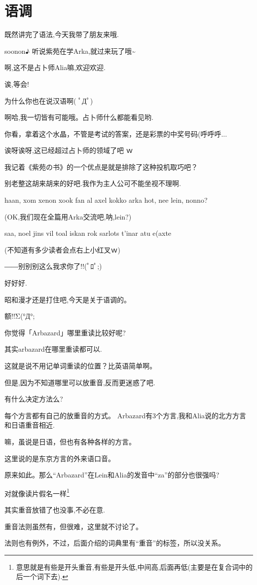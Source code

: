 \chapter[语调]{语调}
既然讲完了语法,今天我带了朋友来哦.

soonon♪
听说紫苑在学Arka,就过来玩了哦\~{}


啊,这不是占卜师Alia嘛,欢迎欢迎.

诶,等会!

为什么你也在说汉语啊( ﾟДﾟ)


啊哈,我一切皆有可能哦。占卜师什么都能看见哟.

你看，拿着这个水晶，不管是考试的答案，还是彩票的中奖号码(呼呼呼...


诶呀诶呀,这已经超过占卜师的领域了吧 ｗ

我记着《紫苑の书》的一个优点是就是排除了这种投机取巧吧？

别老整这胡来胡来的好吧.我作为主人公可不能坐视不理啊.


haan, xom xenon xook fan al axel kokko arka hot, nee lein, nonno?

(OK,我们现在全篇用Arka交流吧,呐,lein?)

saa, noel jins vil toal iskan rok sarlots t'inar atu e(axte

(不知道有多少读者会点右上小红叉ｗ)


――别别别这么我求你了!!(ﾟﾛﾟ;)



好好好.

昭和漫才还是打住吧,今天是关于语调的。


额!!Σ(°Д°;


你觉得「Arbazard」哪里重读比较好呢?

其实arbazard在哪里重读都可以.


这就是说不用记单词重读的位置？比英语简单啊。

但是,因为不知道哪里可以放重音,反而更迷惑了吧.

有什么决定方法么?


每个方言都有自己的放重音的方式。
Arbazard有3个方言,我和Alia说的北方方言和日语重音相近.


嘛，虽说是日语，但也有各种各样的方言。

这里说的是东京方言的外来语口音。


原来如此。那么“Arbazard”在Lein和Alia的发音中“za”的部分也很强吗?


对就像读片假名一样\footnote{意思就是有些是开头重音,有些是开头低,中间高,后面再低(主要是在复合词中的后一个词下去).}

其实重音放错了也没事,不必在意.


重音法则虽然有，但很难，这里就不讨论了。

法则也有例外，不过，后面介绍的词典里有“重音”的标签，所以没关系。
